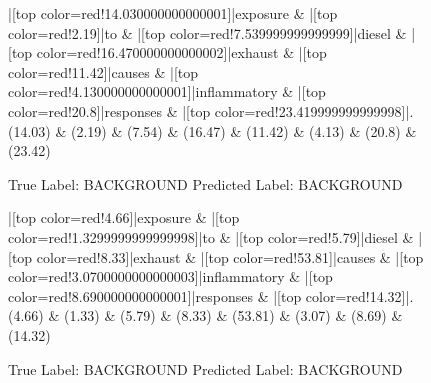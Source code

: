 \documentclass[a4paper, landscape]{article}
\begin{document}
\clearpage
\begin{figure}
\begin{center}
\begin{dependency}
\begin{deptext}
|[top color=red!14.030000000000001]|exposure \& |[top color=red!2.19]|to \& |[top color=red!7.539999999999999]|diesel \& |[top color=red!16.470000000000002]|exhaust \& |[top color=red!11.42]|causes \& |[top color=red!4.130000000000001]|inflammatory \& |[top color=red!20.8]|responses \& |[top color=red!23.419999999999998]|.\\
(14.03) \& (2.19) \& (7.54) \& (16.47) \& (11.42) \& (4.13) \& (20.8) \& (23.42)\\
\end{deptext}
\end{dependency}
\end{center}
\caption{True Label: BACKGROUND Predicted Label: BACKGROUND}
\end{figure}
\clearpage
\begin{figure}
\begin{center}
\begin{dependency}
\begin{deptext}
|[top color=red!4.66]|exposure \& |[top color=red!1.3299999999999998]|to \& |[top color=red!5.79]|diesel \& |[top color=red!8.33]|exhaust \& |[top color=red!53.81]|causes \& |[top color=red!3.0700000000000003]|inflammatory \& |[top color=red!8.690000000000001]|responses \& |[top color=red!14.32]|.\\
(4.66) \& (1.33) \& (5.79) \& (8.33) \& (53.81) \& (3.07) \& (8.69) \& (14.32)\\
\end{deptext}
\end{dependency}
\end{center}
\caption{True Label: BACKGROUND Predicted Label: BACKGROUND}
\end{figure}
\clearpage
\end{document}
